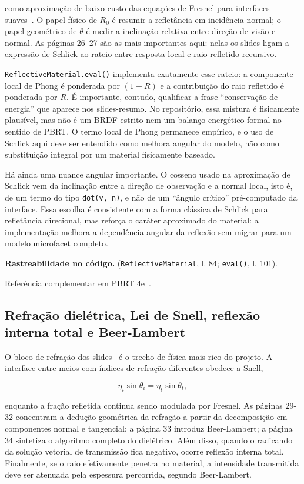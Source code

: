 \documentclass[portuguese]{sbcreviews-2025}%
\newcommand{\slidescite}[2]{\citep[pp.~#2]{#1}}
\newcommand{\pbrtsec}[1]{PBRT 4e~\citep[Se\c{c}\~ao~#1]{pharr2023pbrt}}
\begin{document}
como aproximação de baixo custo das equações de Fresnel para interfaces suaves~\slidescite{inf2608slides05}{26--28}. O papel físico de $R_0$ é resumir a refletância em incidência normal; o papel geométrico de $\theta$ é medir a inclinação relativa entre direção de visão e normal. As páginas 26--27 são as mais importantes aqui: nelas os slides ligam a expressão de Schlick ao rateio entre resposta local e raio refletido recursivo.

\texttt{ReflectiveMaterial.eval()} implementa exatamente esse rateio: a componente local de Phong é ponderada por $(1-R)$ e a contribuição do raio refletido é ponderada por $R$. É importante, contudo, qualificar a frase ``conservação de energia'' que aparece nos slides-resumo. No repositório, essa mistura é fisicamente plausível, mas não é um BRDF estrito nem um balanço energético formal no sentido de PBRT. O termo local de Phong permanece empírico, e o uso de Schlick aqui deve ser entendido como melhora angular do modelo, não como substituição integral por um material fisicamente baseado.

Há ainda uma nuance angular importante. O cosseno usado na aproximação de Schlick vem da inclinação entre a direção de observação e a normal local, isto é, de um termo do tipo \texttt{dot(v, n)}, e não de um ``ângulo crítico'' pré-computado da interface. Essa escolha é consistente com a forma clássica de Schlick para refletância direcional, mas reforça o caráter aproximado do material: a implementação melhora a dependência angular da reflexão sem migrar para um modelo microfacet completo.

\noindent\textbf{Rastreabilidade no código.}  (\texttt{ReflectiveMaterial}, l. 84; \texttt{eval()}, l. 101).

Referência complementar em \pbrtsec{9.3}.

\subsection{Refração dielétrica, Lei de Snell, reflexão interna total e Beer-Lambert}
\label{sec:slide5-refracao}

O bloco de refração dos slides~\slidescite{inf2608slides05}{29--36} é o trecho de física mais rico do projeto. A interface entre meios com índices de refração diferentes obedece a Snell,

\[
\eta_i \sin\theta_i = \eta_t \sin\theta_t,
\]

enquanto a fração refletida continua sendo modulada por Fresnel. As páginas 29-32 concentram a dedução geométrica da refração a partir da decomposição em componentes normal e tangencial; a página 33 introduz Beer-Lambert; a página 34 sintetiza o algoritmo completo do dielétrico. Além disso, quando o radicando da solução vetorial de transmissão fica negativo, ocorre reflexão interna total. Finalmente, se o raio efetivamente penetra no material, a intensidade transmitida deve ser atenuada pela espessura percorrida, segundo Beer-Lambert.
\end{document}
